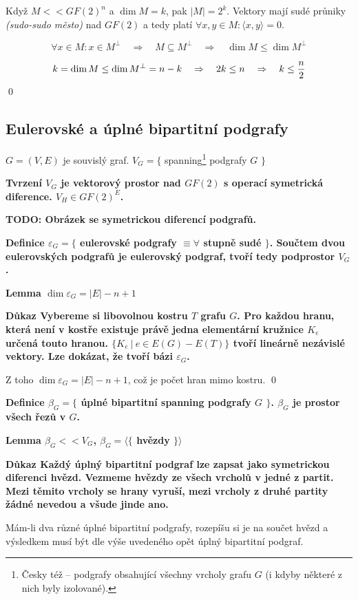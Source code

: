 \documentclass[a4paper,12pt,titlepage]{article}
\newcommand{\lm}{\smallskip\noindent\bf Lemma\rm{} }
\newcommand{\dk}{\smallskip\noindent\bf Důkaz\rm{} }
\newcommand{\df}{\smallskip\noindent\bf Definice\rm{} }
\newcommand{\tv}{\smallskip\noindent\bf Tvrzení\rm{} }
\newcommand{\todo}[1]{\bf TODO: \rm#1}
\newcommand{\sk}[1]{\langle #1\rangle}
\begin{document}
Když $M << GF(2)^n$ a $\dim M = k$, pak $|M| = 2^k$. Vektory mají sudé průniky {\it (sudo-sudo město)} nad $GF(2)$ a tedy platí $\forall x,y\in M: \sk{x,y} = 0$.

$$\forall x\in M: x\in M^\bot \quad\Rightarrow\quad M\subseteq M^\bot \quad\Rightarrow\quad \dim M \le \dim M^\bot$$

$$k = \dim M \le \dim M^\bot = n-k \quad\Rightarrow\quad 2k \le n \quad\Rightarrow\quad k \le {n\over 2}$$
\qed

\subsection{Eulerovské a úplné bipartitní podgrafy}

$G = (V,E)$ je souvislý graf. $V_G = \{$ spanning\footnote{Česky též  -- podgrafy obsahující všechny vrcholy grafu $G$ (i kdyby některé z nich byly izolované).} podgrafy $G$ $\}$

\tv $V_G$ je vektorový prostor nad $GF(2)$ s operací symetrická diference. $V_H \in GF(2)^E$.

\bigskip
\todo Obrázek se symetrickou diferencí podgrafů.
\bigskip

\df $\varepsilon_G = \{ $ eulerovské podgrafy $\equiv
\forall $ stupně sudé $ \}$. Součtem dvou eulerovských podgrafů je eulerovský
podgraf, tvoří tedy podprostor $V_G$.

\lm $\dim \varepsilon_G = |E| - n + 1$

\dk Vybereme si libovolnou kostru $T$ grafu $G$. Pro každou hranu, která není v
kostře existuje právě jedna elementární kružnice $K_e$ určená touto hranou. $\{
K_e\ |\ e \in E(G) - E(T) \}$ tvoří lineárně nezávislé vektory. Lze dokázat,
že tvoří bázi $\varepsilon_G$.

Z toho $\dim \varepsilon_G = |E| - n + 1$, což je počet hran mimo kostru. \qed

\df $\beta_G = \{$ úplné bipartitní spanning podgrafy $G$ $\}$. $\beta_G$ je
prostor všech řezů v $G$.

\lm $\beta_G << V_G$, $\beta_G = \langle\{$ hvězdy $\}\rangle$

\dk Každý úplný bipartitní podgraf lze zapsat jako symetrickou diferenci hvězd.
Vezmeme hvězdy ze všech vrcholů v jedné z partit. Mezi těmito vrcholy se hrany
vyruší, mezi vrcholy z druhé partity žádné nevedou a všude jinde ano. 

Mám-li dva různé úplné bipartitní podgrafy, rozepíšu si je na součet hvězd a
výsledkem musí být dle výše uvedeného opět úplný bipartitní podgraf.
\end{document}
